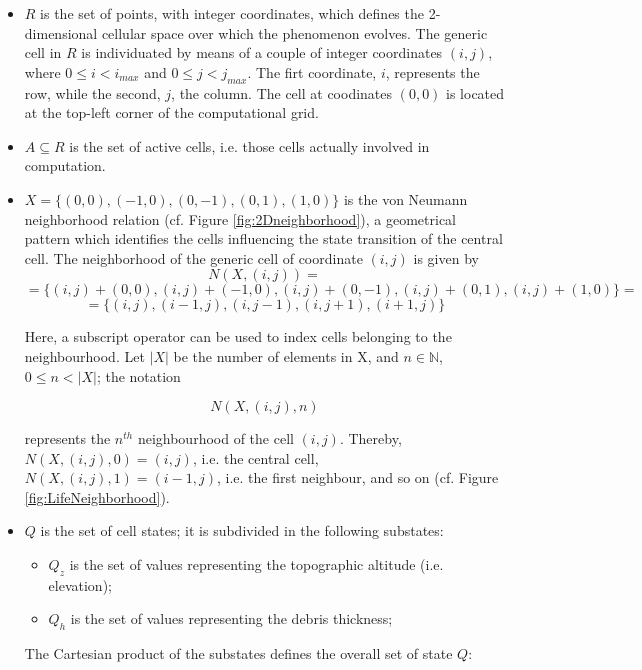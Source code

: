 \begin{itemize}

\item $R$ is the set of points, with integer coordinates, which
  defines the 2-dimensional cellular space over which the phenomenon
  evolves. The generic cell in $R$ is individuated by means of a
  couple of integer coordinates $(i, j)$, where $0 \leq i < i_{max}$
  and $0 \leq j < j_{max}$. The firt coordinate, $i$, represents the
  row, while the second, $j$, the column. The cell at coodinates
  $(0,0)$ is located at the top-left corner of the computational grid.

\item $A \subseteq R$ is the set of active cells, i.e. those cells
  actually involved in computation.

\item $X = \{(0,0), (-1, 0), (0, -1), (0, 1), (1, 0)\}$ is the von
  Neumann neighborhood relation (cf. Figure \ref{fig:2Dneighborhood}),
  a geometrical pattern which identifies the cells influencing the
  state transition of the central cell. The neighborhood of the
  generic cell of coordinate $(i, j)$ is given by
$$N(X, (i, j)) =$$
$$= \{(i, j)+(0,0), (i, j)+(-1, 0), (i, j)+(0, -1),
(i, j)+(0, 1), (i, j)+(1, 0)\} =$$
$$= \{(i, j), (i-1, j), (i, j-1), (i, j+1), (i+1, j)\}$$

Here, a subscript operator can be used to index cells belonging to the
neighbourhood. Let $|X|$ be the number of elements in X, and $n \in
\mathbb{N}$, $0 \leq n < |X|$; the notation

$$N(X, (i, j), n)$$

represents the $n^{th}$ neighbourhood of the cell $(i,j)$. Thereby,
$N(X, (i, j), 0) = (i, j)$, i.e. the central cell, $N(X, (i, j), 1) =
(i-1, j)$, i.e. the first neighbour, and so on (cf. Figure
\ref{fig:LifeNeighborhood}).

\item $Q$ is the set of cell states; it is subdivided in the following
  substates:

\begin{itemize}
    \item   $Q_z$ is the set of values representing the topographic altitude (i.e. elevation);
    \item   $Q_h$ is the set of values representing the debris thickness;
\end{itemize}

The Cartesian product of the substates defines the overall set of
state $Q$:


\end{itemize}
